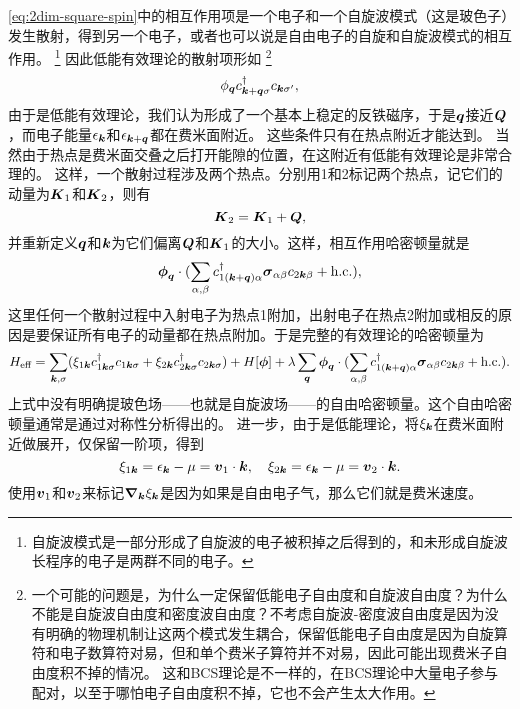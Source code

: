 \documentclass[hyperref, UTF8, a4paper]{ctexart}
\begin{document}
\eqref{eq:2dim-square-spin}中的相互作用项是一个电子和一个自旋波模式（这是玻色子）发生散射，得到另一个电子，或者也可以说是自由电子的自旋和自旋波模式的相互作用。%
\footnote{自旋波模式是一部分形成了自旋波的电子被积掉之后得到的，和未形成自旋波长程序的电子是两群不同的电子。}%
因此低能有效理论的散射项形如%
\footnote{一个可能的问题是，为什么一定保留低能电子自由度和自旋波自由度？为什么不能是自旋波自由度和密度波自由度？不考虑自旋波-密度波自由度是因为没有明确的物理机制让这两个模式发生耦合，保留低能电子自由度是因为自旋算符和电子数算符对易，但和单个费米子算符并不对易，因此可能出现费米子自由度积不掉的情况。
这和BCS理论是不一样的，在BCS理论中大量电子参与配对，以至于哪怕电子自由度积不掉，它也不会产生太大作用。}%
\[
    {\phi}_{\vb*{q}} {c}^\dagger_{\vb*{k}+\vb*{q}\sigma} {c}_{\vb*{k}\sigma'},
\]
由于是低能有效理论，我们认为形成了一个基本上稳定的反铁磁序，于是$\vb*{q}$接近$\vb*{Q}$，而电子能量$\epsilon_{\vb*{k}}$和$\epsilon_{\vb*{k}+\vb*{q}}$都在费米面附近。
这些条件只有在热点附近才能达到。
当然由于热点是费米面交叠之后打开能隙的位置，在这附近有低能有效理论是非常合理的。
这样，一个散射过程涉及两个热点。分别用1和2标记两个热点，记它们的动量为$\vb*{K}_1$和$\vb*{K}_2$，则有
\[
    \vb*{K}_2 = \vb*{K}_1 + \vb*{Q},
\]
并重新定义$\vb*{q}$和$\vb*{k}$为它们偏离$\vb*{Q}$和$\vb*{K}_1$的大小。这样，相互作用哈密顿量就是
\[
    {\vb*{\phi}}_{\vb*{q}} \cdot (\sum_{\alpha, \beta} {c}^\dagger_{1(\vb*{k} + \vb*{q})\alpha} \vb*{\sigma}_{\alpha \beta} {c}_{2\vb*{k} \beta} + \text{h.c.}),
\]
这里任何一个散射过程中入射电子为热点1附加，出射电子在热点2附加或相反的原因是要保证所有电子的动量都在热点附加。于是完整的有效理论的哈密顿量为
\begin{equation}
    {H}_\text{eff} = \sum_{\vb*{k}, \sigma} (\xi_{1\vb*{k}} {c}^\dagger_{1\vb*{k} \sigma} {c}_{1 \vb*{k} \sigma} + \xi_{2\vb*{k}} {c}^\dagger_{2\vb*{k} \sigma} {c}_{2 \vb*{k} \sigma}) + {H}[\vb*{\phi}] + \lambda \sum_{\vb*{q}} {\vb*{\phi}}_{\vb*{q}} \cdot (\sum_{\alpha, \beta} {c}^\dagger_{1(\vb*{k} + \vb*{q})\alpha} \vb*{\sigma}_{\alpha \beta} {c}_{2\vb*{k} \beta} + \text{h.c.}).
    \label{eq:2dim-square-spin-eff}
\end{equation}
上式中没有明确提玻色场——也就是自旋波场——的自由哈密顿量。这个自由哈密顿量通常是通过对称性分析得出的。
进一步，由于是低能理论，将$\xi_{\vb*{k}}$在费米面附近做展开，仅保留一阶项，得到
\begin{equation}
    \xi_{1\vb*{k}} = \epsilon_{\vb*{k}} - \mu = \vb*{v}_1 \cdot \vb*{k}, \quad \xi_{2\vb*{k}} = \epsilon_{\vb*{k}} - \mu = \vb*{v}_2 \cdot \vb*{k}.
\end{equation}
使用$\vb*{v}_1$和$\vb*{v}_2$来标记$\grad_{\vb*{k}}{\xi_{\vb*{k}}}$是因为如果是自由电子气，那么它们就是费米速度。
\end{document}
